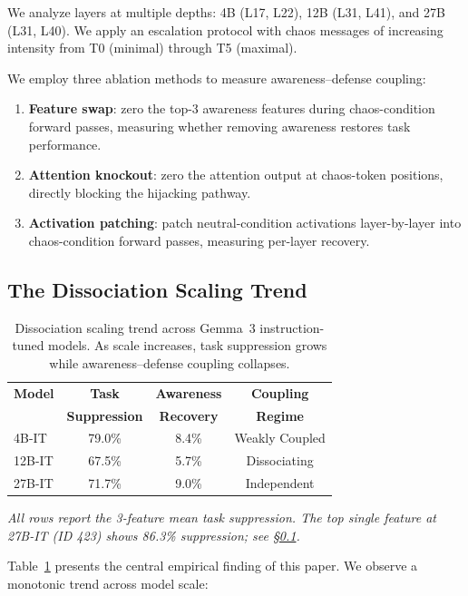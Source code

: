 \documentclass[10pt,twocolumn]{article}
\newcommand{\gemma}{Gemma~3\xspace}
\begin{document}
We analyze layers at multiple depths: 4B (L17, L22), 12B (L31, L41), and 27B (L31, L40).
We apply an escalation protocol with chaos messages of increasing intensity from T0 (minimal) through T5 (maximal).

We employ three ablation methods to measure awareness--defense coupling:
\begin{enumerate}
    \item \textbf{Feature swap}: zero the top-3 awareness features during chaos-condition forward passes, measuring whether removing awareness restores task performance.
    \item \textbf{Attention knockout}: zero the attention output at chaos-token positions, directly blocking the hijacking pathway.
    \item \textbf{Activation patching}: patch neutral-condition activations layer-by-layer into chaos-condition forward passes, measuring per-layer recovery.
\end{enumerate}

\subsection{The Dissociation Scaling Trend}
\label{sec:dissociation}

\begin{table}[t]
\centering
\caption{Dissociation scaling trend across \gemma instruction-tuned models. As scale increases, task suppression grows while awareness--defense coupling collapses.}
\label{tab:dissociation}
\small
\begin{tabular}{@{}lccc@{}}
\toprule
\textbf{Model} & \textbf{Task} & \textbf{Awareness} & \textbf{Coupling} \\
 & \textbf{Suppression} & \textbf{Recovery} & \textbf{Regime} \\
\midrule
4B-IT  & 79.0\% & 8.4\%  & Weakly Coupled \\
12B-IT & 67.5\% & 5.7\%  & Dissociating \\
27B-IT & 71.7\% & 9.0\%  & Independent \\
\bottomrule
\end{tabular}
\footnotesize\textit{All rows report the 3-feature mean task suppression. The top single feature at 27B-IT (ID 423) shows 86.3\% suppression; see \S\ref{sec:dissociation}.}
\end{table}

Table~\ref{tab:dissociation} presents the central empirical finding of this paper.
We observe a monotonic trend across model scale:
\end{document}
